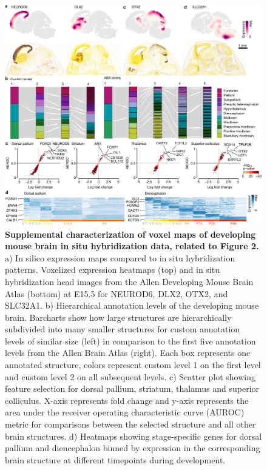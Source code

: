 \begin{figure}[h!]
    \centering
	\includegraphics[width=\textwidth]{figures/voxhunt/Supp_1}
    \caption{\textbf{Supplemental characterization of voxel maps of developing mouse brain in situ hybridization data, related to Figure 2.} a) In silico expression maps compared to in situ hybridization patterns. Voxelized expression heatmaps (top) and in situ hybridization head images from the Allen Developing Mouse Brain Atlas (bottom) at E15.5 for NEUROD6, DLX2, OTX2, and SLC32A1. b) Hierarchical annotation levels of the developing mouse brain. Barcharts show how large structures are hierarchically subdivided into many smaller structures for custom annotation levels of similar size (left) in comparison to the first five annotation levels from the Allen Brain Atlas (right). Each box represents one annotated structure, colors represent custom level 1 on the first level and custom level 2 on all subsequent levels. c) Scatter plot showing feature selection for dorsal pallium, striatum, thalamus and superior colliculus. X-axis represents fold change and y-axis represents the area under the receiver operating characteristic curve (AUROC) metric for comparisons between the selected structure and all other brain structures. d) Heatmaps showing stage-specific genes for dorsal pallium and diencephalon binned by expression in the corresponding brain structure at different timepoints during development.}
    \label{fig:voxS1}
\end{figure}

